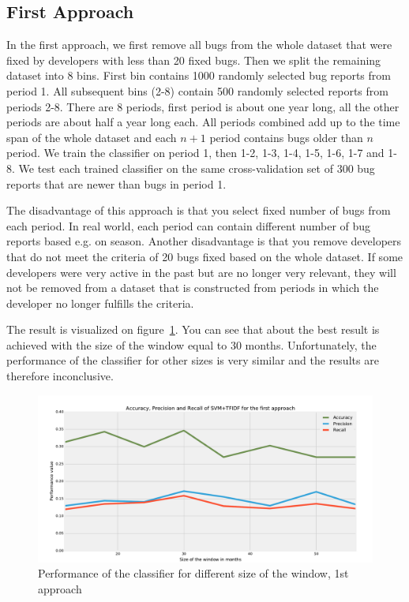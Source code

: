 \subsection{First Approach}

In the first approach, we first remove all bugs from the whole dataset that were fixed by developers with less than 20 fixed bugs. Then we split the remaining dataset into 8 bins. First bin contains 1000 randomly selected bug reports from period 1. All subsequent bins (2-8) contain 500 randomly selected reports from periods 2-8. There are 8 periods, first period is about one year long, all the other periods are about half a year long each. All periods combined add up to the time span of the whole dataset and each $n+1$ period contains bugs older than $n$ period. We train the classifier on period 1, then 1-2, 1-3, 1-4, 1-5, 1-6, 1-7 and 1-8. We test each trained classifier on the same cross-validation set of 300 bug reports that are newer than bugs in period 1.

The disadvantage of this approach is that you select fixed number of bugs from each period. In real world, each period can contain different number of bug reports based e.g. on season. Another disadvantage is that you remove developers that do not meet the criteria of 20 bugs fixed based on the whole dataset. If some developers were very active in the past but are no longer very relevant, they will not be removed from a dataset that is constructed from periods in which the developer no longer fulfills the criteria.

The result is visualized on figure~\ref{fig:window.firefox.1a}. You can see that about the best result is achieved with the size of the window equal to 30 months. Unfortunately, the performance of the classifier for other sizes is very similar and the results are therefore inconclusive.

\begin{figure}[htbp]
    \centering
        \includegraphics[width=\textwidth]{./images/window_size/firefox_1a.pdf}
    \caption{Performance of the classifier for different size of the window, 1st approach}
    \label{fig:window.firefox.1a}
\end{figure}

